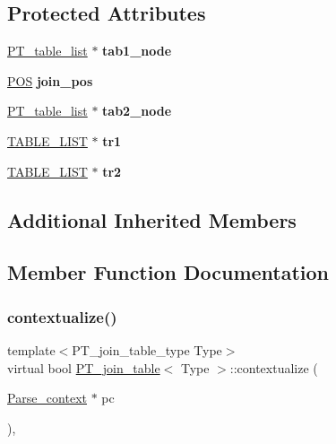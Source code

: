 \subsection*{Protected Attributes}
\begin{DoxyCompactItemize}
\item 
\mbox{\label{classPT__join__table_a1dd4a3c699f7e1a0d252fea79629a234}} 
\mbox{\hyperlink{classPT__table__list}{P\+T\+\_\+table\+\_\+list}} $\ast$ {\bfseries tab1\+\_\+node}
\item 
\mbox{\label{classPT__join__table_ada7d9ede5e236d30eab6eb0974f83406}} 
\mbox{\hyperlink{structYYLTYPE}{P\+OS}} {\bfseries join\+\_\+pos}
\item 
\mbox{\label{classPT__join__table_a315ab52bede579f46436bf59d7fc1759}} 
\mbox{\hyperlink{classPT__table__list}{P\+T\+\_\+table\+\_\+list}} $\ast$ {\bfseries tab2\+\_\+node}
\item 
\mbox{\label{classPT__join__table_aebf817361bc3d64b7c4d061ca4289b5c}} 
\mbox{\hyperlink{structTABLE__LIST}{T\+A\+B\+L\+E\+\_\+\+L\+I\+ST}} $\ast$ {\bfseries tr1}
\item 
\mbox{\label{classPT__join__table_a8ddd6bb865cd1fead1ab89a96b524eac}} 
\mbox{\hyperlink{structTABLE__LIST}{T\+A\+B\+L\+E\+\_\+\+L\+I\+ST}} $\ast$ {\bfseries tr2}
\end{DoxyCompactItemize}
\subsection*{Additional Inherited Members}


\subsection{Member Function Documentation}
\mbox{\label{classPT__join__table_aa012b30af4f4d06a215c95d5417dba78}} 
\subsubsection{\texorpdfstring{contextualize()}{contextualize()}}
{\footnotesize\ttfamily template$<$P\+T\+\_\+join\+\_\+table\+\_\+type Type$>$ \\
virtual bool \mbox{\hyperlink{classPT__join__table}{P\+T\+\_\+join\+\_\+table}}$<$ Type $>$\+::contextualize (\begin{DoxyParamCaption}\item[{\mbox{\hyperlink{structParse__context}{Parse\+\_\+context}} $\ast$}]{pc }\end{DoxyParamCaption})\hspace{0.3cm}{\ttfamily [inline]}, {\ttfamily [virtual]}}

